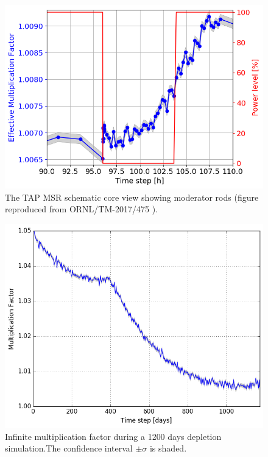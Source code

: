 \documentclass{anstrans}
\begin{document}
\begin{figure}[htbp!] %
	\centering
	\includegraphics[width=\linewidth]{tap_keff_zoomed.png}
	\caption{The \gls{TAP} \gls{MSR} schematic core view showing moderator 
		rods (figure reproduced from ORNL/TM-2017/475 
		\cite{betzler_assessment_2017}).}
	\label{fig:zoneI}
\end{figure}
\begin{figure}[htbp!] %
        \centering
        \includegraphics[width=1.05\linewidth]{keff.png}
        \caption{Infinite multiplication factor during a 1200 days depletion
        simulation.The confidence interval $\pm\sigma$ is shaded.}
        \label{fig:keff}
\end{figure}
\end{document}
